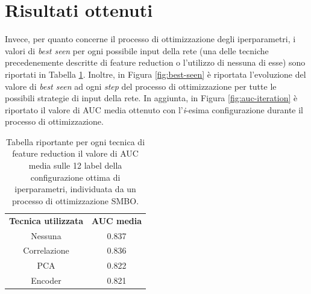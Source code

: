 \section{Risultati ottenuti}

Invece, per quanto concerne il processo di ottimizzazione degli iperparametri, i valori di \textit{best seen} per ogni possibile input della rete (una delle tecniche precedenemente descritte di feature reduction o l'utilizzo di nessuna di esse) sono riportati in Tabella \ref{tab:bestseen}. 
Inoltre, in Figura \ref{fig:best-seen} è riportata l'evoluzione del valore di \textit{best seen} ad ogni \textit{step} del processo di ottimizzazione per tutte le possibili strategie di input della rete.
In aggiunta, in Figura \ref{fig:auc-iteration} è riportato il valore di AUC media ottenuto con l'\textit{i}-esima configurazione durante il processo di ottimizzazione.

\begin{table}
	\centering
	\caption{Tabella riportante per ogni tecnica di feature reduction il valore di AUC media sulle 12 label della configurazione ottima di iperparametri, individuata da un processo di ottimizzazione SMBO.}
	\begin{tabular}{c|c}
		\label{tab:bestseen}
		\textbf{Tecnica utilizzata} & \textbf{AUC media} \\
		Nessuna & 0.837 \\ 
		Correlazione & 0.836 \\ 
		PCA & 0.822 \\ 
		Encoder & 0.821 \\ 
	\end{tabular}
\end{table}

